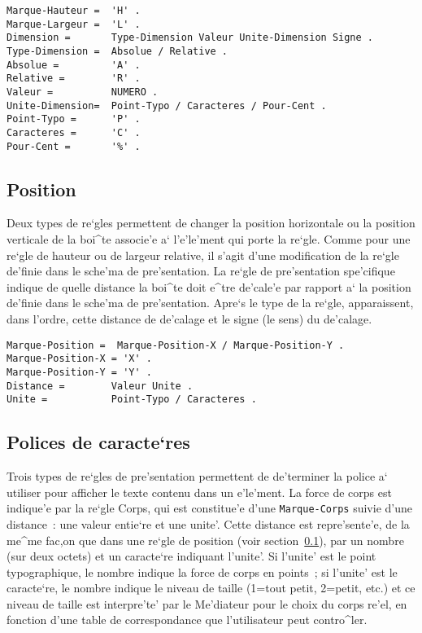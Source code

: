 \begin{verbatim}
Marque-Hauteur =  'H' .
Marque-Largeur =  'L' .
Dimension =       Type-Dimension Valeur Unite-Dimension Signe .
Type-Dimension =  Absolue / Relative .
Absolue =         'A' .
Relative =        'R' .
Valeur =          NUMERO .
Unite-Dimension=  Point-Typo / Caracteres / Pour-Cent .
Point-Typo =      'P' .
Caracteres =      'C' .
Pour-Cent =       '%' .
\end{verbatim}

\subsection{Position}
\label{position}

Deux types de re`gles permettent de changer la position horizontale ou
la position verticale de la boi^te associe'e a` l'e'le'ment qui porte la re`gle.
Comme pour une re`gle de hauteur ou de largeur relative, il s'agit d'une
modification de la re`gle de'finie dans le sche'ma de pre'sentation. La
re`gle de pre'sentation spe'cifique indique de quelle distance la boi^te
doit e^tre de'cale'e par rapport a` la position de'finie dans le sche'ma de
pre'sentation. Apre`s le type de la re`gle, apparaissent, dans l'ordre, cette
distance de de'calage et le signe (le sens) du de'calage.

\begin{verbatim}
Marque-Position =  Marque-Position-X / Marque-Position-Y .
Marque-Position-X = 'X' .
Marque-Position-Y = 'Y' .
Distance =        Valeur Unite .
Unite =           Point-Typo / Caracteres .
\end{verbatim}

\subsection{Polices de caracte`res}

Trois types de re`gles de pre'sentation permettent de de'terminer la police a`
utiliser pour afficher le texte contenu dans un e'le'ment. La force de corps
est indique'e par la re`gle Corps, qui est constitue'e d'une {\tt Marque-Corps}
suivie d'une distance~: une valeur entie`re et une unite'. Cette distance
est repre'sente'e, de la me^me fac,on que dans une re`gle de position
(voir section~\ref{position}), par un nombre (sur deux octets) et un caracte`re
indiquant l'unite'. Si l'unite' est le point typographique, le nombre indique
la force de corps en points~; si l'unite' est le caracte`re, le nombre indique
le niveau de taille (1=tout petit, 2=petit, etc.) et ce niveau de taille est
interpre'te' par le Me'diateur pour le choix du corps re'el, en fonction d'une
table de correspondance que l'utilisateur peut contro^ler.

